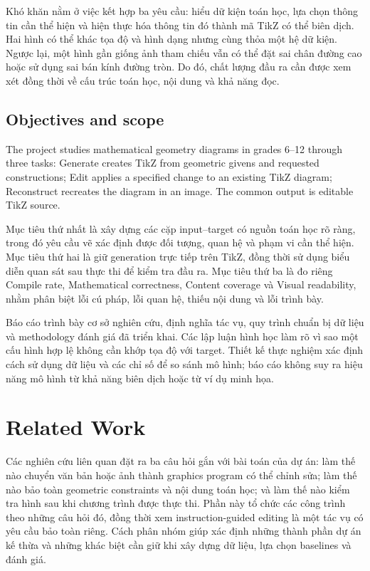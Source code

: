 \documentclass[a4paper,12pt]{article}
\begin{document}
Khó khăn nằm ở việc kết hợp ba yêu cầu: hiểu dữ kiện toán học, lựa chọn thông tin cần thể hiện và hiện thực hóa thông tin đó thành mã TikZ có thể biên dịch. Hai hình có thể khác tọa độ và hình dạng nhưng cùng thỏa một hệ dữ kiện. Ngược lại, một hình gần giống ảnh tham chiếu vẫn có thể đặt sai chân đường cao hoặc sử dụng sai bán kính đường tròn. Do đó, chất lượng đầu ra cần được xem xét đồng thời về cấu trúc toán học, nội dung và khả năng đọc.

\subsection{Objectives and scope}
The project studies mathematical geometry diagrams in grades 6--12 through three tasks: Generate creates TikZ from geometric givens and requested constructions; Edit applies a specified change to an existing TikZ diagram; Reconstruct recreates the diagram in an image. The common output is editable TikZ source.

Mục tiêu thứ nhất là xây dựng các cặp input--target có nguồn toán học rõ ràng, trong đó yêu cầu vẽ xác định được đối tượng, quan hệ và phạm vi cần thể hiện. Mục tiêu thứ hai là giữ generation trực tiếp trên TikZ, đồng thời sử dụng biểu diễn quan sát sau thực thi để kiểm tra đầu ra. Mục tiêu thứ ba là đo riêng Compile rate, Mathematical correctness, Content coverage và Visual readability, nhằm phân biệt lỗi cú pháp, lỗi quan hệ, thiếu nội dung và lỗi trình bày.

Báo cáo trình bày cơ sở nghiên cứu, định nghĩa tác vụ, quy trình chuẩn bị dữ liệu và methodology đánh giá đã triển khai. Các lập luận hình học làm rõ vì sao một cấu hình hợp lệ không cần khớp tọa độ với target. Thiết kế thực nghiệm xác định cách sử dụng dữ liệu và các chỉ số để so sánh mô hình; báo cáo không suy ra hiệu năng mô hình từ khả năng biên dịch hoặc từ ví dụ minh họa.

\section{Related Work}
\label{sec:related-work}
Các nghiên cứu liên quan đặt ra ba câu hỏi gắn với bài toán của dự án: làm thế nào chuyển văn bản hoặc ảnh thành graphics program có thể chỉnh sửa; làm thế nào bảo toàn geometric constraints và nội dung toán học; và làm thế nào kiểm tra hình sau khi chương trình được thực thi. Phần này tổ chức các công trình theo những câu hỏi đó, đồng thời xem instruction-guided editing là một tác vụ có yêu cầu bảo toàn riêng. Cách phân nhóm giúp xác định những thành phần dự án kế thừa và những khác biệt cần giữ khi xây dựng dữ liệu, lựa chọn baselines và đánh giá.
\end{document}
